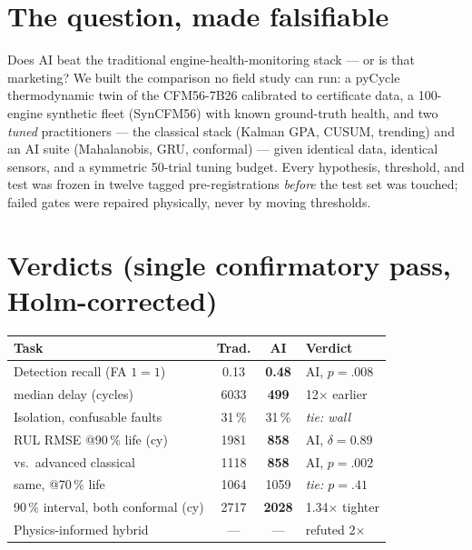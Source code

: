 \documentclass[11pt,twocolumn]{article}
\begin{document}

\balance
\section{The question, made falsifiable}
Does AI beat the traditional engine-health-monitoring stack --- or is that marketing? We
built the comparison no field study can run: a pyCycle thermodynamic twin of the CFM56-7B26
calibrated to certificate data, a 100-engine synthetic fleet (SynCFM56) with known
ground-truth health, and two \emph{tuned} practitioners --- the classical stack (Kalman GPA,
CUSUM, trending) and an AI suite (Mahalanobis, GRU, conformal) --- given identical data,
identical sensors, and a symmetric 50-trial tuning budget. Every hypothesis, threshold, and
test was frozen in twelve tagged pre-registrations \emph{before} the test set was touched;
failed gates were repaired physically, never by moving thresholds.

\section{Verdicts (single confirmatory pass, Holm-corrected)}
\begin{center}\small
\setlength{\tabcolsep}{3pt}
\begin{tabular}{@{}lccl@{}}
\toprule
Task & Trad. & AI & Verdict \\
\midrule
Detection recall (FA $1{=}1$) & 0.13 & \textbf{0.48} & AI, $p{=}.008$ \\
\quad median delay (cycles) & 6033 & \textbf{499} & 12$\times$ earlier \\
Isolation, confusable faults & 31\,\% & 31\,\% & \emph{tie: wall} \\
RUL RMSE @90\,\% life (cy) & 1981 & \textbf{858} & AI, $\delta{=}0.89$ \\
\quad vs.\ advanced classical & 1118 & \textbf{858} & AI, $p{=}.002$ \\
\quad same, @70\,\% life & 1064 & 1059 & \emph{tie: $p{=}.41$} \\
90\,\% interval, both conformal (cy) & 2717 & \textbf{2028} & 1.34$\times$ tighter \\
Physics-informed hybrid & --- & --- & refuted 2$\times$ \\
\bottomrule
\end{tabular}
\end{center}
\end{document}
